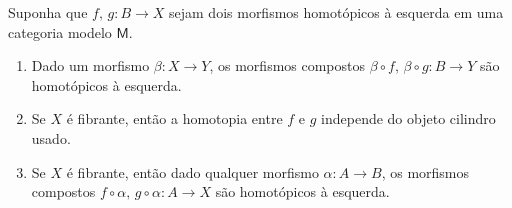 \begin{prop}\label{prop:composicao_a_esquerda_preserva_homotopia_a_esquerda}
  Suponha que $f,\,g : B \to X$ sejam dois morfismos homotópicos à esquerda em uma categoria modelo $\mathsf{M}$.

  \begin{enumerate}
  \item Dado um morfismo $\beta: X \to Y$, os morfismos compostos $\beta \circ f,\, \beta \circ g: B \to Y$ são homotópicos à esquerda.
    
  \item Se $X$ é fibrante, então a homotopia entre $f$ e $g$ independe do objeto cilindro usado.
    
  \item Se $X$ é fibrante, então dado qualquer morfismo $\alpha: A \to B$, os morfismos compostos $f \circ \alpha,\, g \circ \alpha: A \to X$ são homotópicos à esquerda.
  \end{enumerate}
\end{prop}

